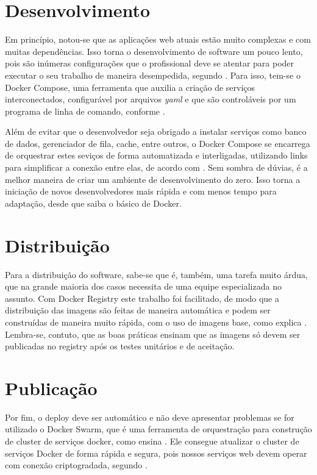 \documentclass[
	12pt,				%
	openright,			%
	oneside,			%
	a4paper,			%
	chapter=TITLE,		%
	section=TITLE,		%
	english,			%
	french,				%
	spanish,			%
	brazil				%
	]{abntex2}
\begin{document}
\section{Desenvolvimento}

Em princípio, notou-se que as aplicações web atuais estão muito complexas e com muitas dependências. Isso torna o desenvolvimento de software um pouco lento, pois são inúmeras configurações que o profissional deve se atentar para poder executar o seu trabalho de maneira desempedida, segundo . Para isso, tem-se o Docker Compose, uma ferramenta que auxilia a criação de serviços interconectados, configurável por arquivos \textit{yaml} e que são controláveis por um programa de linha de comando, conforme .

Além de evitar que o desenvolvedor seja obrigado a instalar serviços como banco de dados, gerenciador de fila, cache, entre outros, o Docker Compose se encarrega de orquestrar estes seviços de forma automatizada e interligadas, utilizando links para simplificar a conexão entre elas, de acordo com . Sem sombra de dúvias, é a melhor maneira de criar um ambiente de desenvolvimento do zero. Isso torna a iniciação de novos desenvolvedores mais rápida e com menos tempo para adaptação, desde que saiba o básico de Docker.

\section{Distribuição}

Para a distribuição do software, sabe-se que é, também, uma tarefa muito árdua, que na grande maioria dos casos necessita de uma equipe especializada no assunto. Com Docker Registry este trabalho foi facilitado, de modo que a distribuição das imagens são feitas de maneira automática e podem ser construídas de maneira muito rápida, com o uso de imagens base, como explica . Lembra-se, contuto, que as boas práticas ensinam que as imagens só devem ser publicadas no registry após os testes unitários e de aceitação.

\section{Publicação}

Por fim, o deploy deve ser automático e não deve apresentar problemas se for utilizado o Docker Swarm, que é uma ferramenta de orquestração para construção de cluster de serviços docker, como ensina . Ele consegue atualizar o cluster de serviços Docker de forma rápida e segura, pois nossos serviços web devem operar com conexão criptogradada, segundo .
\end{document}

